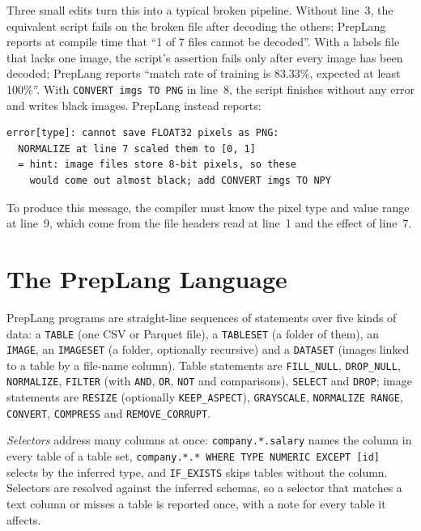 \documentclass[conference]{IEEEtran}
\begin{document}
Three small edits turn this into a typical broken pipeline. Without line~3, the equivalent script
fails on the broken file after decoding the others; PrepLang reports at compile time that
``1 of 7 files cannot be decoded''. With a labels file that lacks one image, the script's
assertion fails only after every image has been decoded; PrepLang reports ``match rate of training
is 83.33\%, expected at least 100\%''. With \texttt{CONVERT imgs TO PNG} in line~8, the script
finishes without any error and writes black images. PrepLang instead reports:

\begin{lstlisting}[language={},numbers=none]
error[type]: cannot save FLOAT32 pixels as PNG:
  NORMALIZE at line 7 scaled them to [0, 1]
  = hint: image files store 8-bit pixels, so these
    would come out almost black; add CONVERT imgs TO NPY
\end{lstlisting}

To produce this message, the compiler must know the pixel type and value range at line~9, which
come from the file headers read at line~1 and the effect of line~7.

\section{The PrepLang Language}\label{sec:lang}

PrepLang programs are straight-line sequences of statements over five kinds of data: a
\texttt{TABLE} (one CSV or Parquet file), a \texttt{TABLESET} (a folder of them), an
\texttt{IMAGE}, an \texttt{IMAGESET} (a folder, optionally recursive) and a \texttt{DATASET} (images
linked to a table by a file-name column). Table statements are \texttt{FILL\_NULL},
\texttt{DROP\_NULL}, \texttt{NORMALIZE}, \texttt{FILTER} (with \texttt{AND}, \texttt{OR},
\texttt{NOT} and comparisons), \texttt{SELECT} and \texttt{DROP}; image statements are
\texttt{RESIZE} (optionally \texttt{KEEP\_ASPECT}), \texttt{GRAYSCALE}, \texttt{NORMALIZE RANGE},
\texttt{CONVERT}, \texttt{COMPRESS} and \texttt{REMOVE\_CORRUPT}.

\emph{Selectors} address many columns at once: \texttt{company.*.salary} names the column in every
table of a table set, \texttt{company.*.* WHERE TYPE NUMERIC EXCEPT [id]} selects by the inferred
type, and \texttt{IF\_EXISTS} skips tables without the column. Selectors are resolved against the
inferred schemas, so a selector that matches a text column or misses a table is reported once, with
a note for every table it affects.
\end{document}
